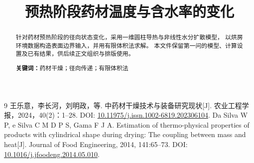 \documentclass[UTF8,12pt,a4paper]{ctexart}
\title{预热阶段药材温度与含水率的变化}
\author{}
\date{}
\newcommand{\keywords}[1]{\par\noindent\textbf{关键词：}#1}
\begin{document}
\maketitle

\begin{abstract}
针对药材预热阶段的径向状态变化，采用一维圆柱导热与非线性水分扩散模型，
以烘房环境数据构造表面边界输入，并用有限体积法求解。
本文件保留第一问的模型、计算设置及已有结果，供后续正文组织与排版使用。
\keywords{药材干燥；径向传递；有限体积法}
\end{abstract}

\clearpage


\begin{thebibliography}{9}
王乐意，李长河，刘明政，等.
中药材干燥技术与装备研究现状[J]. 农业工程学报，2024，40(2)：1--28.
DOI: \href{https://doi.org/10.11975/j.issn.1002-6819.202306104}{10.11975/j.issn.1002-6819.202306104}.
Da Silva W P, e Silva C M D P S, Gama F J A.
Estimation of thermo-physical properties of products with cylindrical shape during drying:
The coupling between mass and heat[J]. Journal of Food Engineering, 2014, 141:65--73.
DOI: \href{https://doi.org/10.1016/j.jfoodeng.2014.05.010}{10.1016/j.jfoodeng.2014.05.010}.
\end{thebibliography}

\clearpage
\appendix

\end{document}
